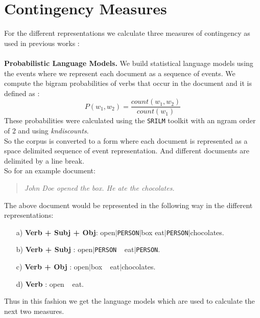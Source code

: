 \documentclass[12pt]{article}
\begin{document}
\section{Contingency Measures}
For the different representations we calculate three measures of contingency as used in previous works : \\
\smallskip \\
{\bf Probabilistic Language Models.}
We build statistical language models using the events where we represent each document as a sequence of events\cite{manshadi}. We compute the bigram probabilities of verbs that occur in the document and it is defined as :
\begin{equation}
P(w_1,w_2) = \frac{count(w_1,w_2)}{count(w_1)}
\end{equation}
These probabilities were calculated using the \texttt{SRILM} toolkit with an ngram order of 2 and using \textit{kndiscounts}. \\
So the corpus is converted to a form where each document is represented as a space delimited sequence of event representation. And different documents are delimited by a line break. \\
So for an example document:
\begin{quote}
	\textit{John Doe opened the box. He ate the chocolates.}
\end{quote}
The above document would be represented in the following way in the different representations:
\begin{enumerate}
	\item[a)] \textbf{Verb + Subj + Obj}: open$|$\texttt{PERSON}$|$box eat$|$\texttt{PERSON}$|$chocolates.
	\item[b)] \textbf{Verb + Subj} : open$|$\texttt{PERSON} $\ \ $ eat$|$\texttt{PERSON}.
	\item[c)] \textbf{Verb + Obj} : open$|$box $\ \ $ eat$|$chocolates.
	\item[d)] \textbf{Verb} : open $\ \ $ eat.
\end{enumerate}

Thus in this fashion we get the language models which are used to calculate the next two measures. \\
\end{document}
